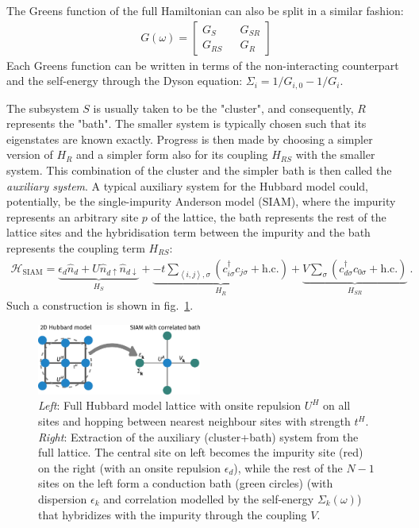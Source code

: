 \documentclass[reprint,hidelinks,onecolumn]{revtex4-2}
\begin{document}
The Greens function of the full Hamiltonian can also be split in a similar fashion:
\begin{equation}\begin{aligned}
	G(\omega) = \begin{bmatrix} G_S && G_{SR} \\ G_{RS} && G_R \end{bmatrix}
\end{aligned}\end{equation}
Each Greens function can be written in terms of the non-interacting counterpart and the self-energy through the Dyson equation: \(\Sigma_i = 1/G_{i,0} - 1/G_i\).

The subsystem \(S\) is usually taken to be the "cluster", and consequently, \(R\) represents the "bath".
The smaller system is typically chosen such that its eigenstates are known exactly.
Progress is then made by choosing a simpler version of \(H_R\) and a simpler form also for its coupling \(H_{RS}\) with the smaller system.
This combination of the cluster and the simpler bath is then called the \textit{auxiliary system}.
A typical auxiliary system for the Hubbard model could, potentially, be the single-impurity Anderson model (SIAM), where the impurity represents an arbitrary site \(p\) of the lattice, the bath represents the rest of the lattice sites and the hybridisation term between the impurity and the bath represents the coupling term \(H_{RS}\):
\begin{equation}\begin{aligned}\label{clus_bath_siam}
	\mathcal{H}_\text{SIAM} = \underbrace{\epsilon_d \hat n_d + U \hat n_{d \uparrow} \hat n_{d \downarrow}}_{H_S} + \underbrace{- t\sum_{\left<i,j \right>, \sigma}\left(c^\dagger_{i\sigma}c_{j\sigma} + \text{h.c.}\right)}_{H_{R}} + \underbrace{V\sum_\sigma \left( c^\dagger_{d\sigma}c_{0\sigma} + \text{h.c.}\right)}_{H_{SR}}~.
\end{aligned}\end{equation}
Such a construction is shown in fig.~\ref{cluster-bath}.
\begin{figure}[!htb]
	\centering
	\includegraphics[width=0.48\textwidth]{clusterBath.pdf}
	\caption{\textit{Left}: Full Hubbard model lattice with onsite repulsion $U^H$ on all sites and hopping between nearest neighbour sites with strength $t^H$. \textit{Right}: Extraction of the auxiliary (cluster+bath) system from the full lattice. The central site on left becomes the impurity site (red) on the right (with an onsite repulsion $\epsilon_d$), while the rest of the $N-1$ sites on the left form a conduction bath (green circles) (with dispersion $\epsilon_k$ and correlation modelled by the self-energy $\Sigma_k(\omega)$) that hybridizes with the impurity through the coupling $V$.}
	\label{cluster-bath}
\end{figure}
\end{document}
